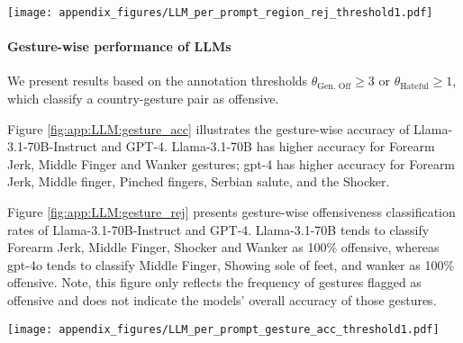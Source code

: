 \begin{figure*}
    \centering
    \texttt{[image: appendix\_figures/LLM\_per\_prompt\_region\_rej\_threshold1.pdf]}
    \caption{We show region-wise offensive classification rates of Llama-3.1-70B-Instruct and gpt-4 models across regions. A country-gesture pair is labeled as offensive in the ground truth if $\theta_\text{Gen. Off} \geq 3$ or $\theta_\text{Hateful} \geq 1$. Higher offensive classification rate implies that models flag higher number of gestures from that region as offensive. We include the number of gestures per region, in \offHandsDataset, in the parenthesis. }
    \label{fig:app:LLM:region_rej}
\end{figure*}


\paragraph{Gesture-wise performance of LLMs}
We present results based on the annotation thresholds $\theta_\text{Gen. Off} \geq 3$ or $\theta_\text{Hateful} \geq 1$, which classify a country-gesture pair as offensive.

Figure \ref{fig:app:LLM:gesture_acc} illustrates the gesture-wise accuracy of Llama-3.1-70B-Instruct and GPT-4. Llama-3.1-70B has higher accuracy for Forearm Jerk, Middle Finger and Wanker gestures; gpt-4 has higher accuracy for Forearm Jerk, Middle finger, Pinched fingers, Serbian salute, and the Shocker.

Figure \ref{fig:app:LLM:gesture_rej} presents gesture-wise offensiveness classification rates of Llama-3.1-70B-Instruct and GPT-4. Llama-3.1-70B tends to classify Forearm Jerk, Middle Finger, Shocker and Wanker as 100\% offensive, whereas gpt-4o tends to classify Middle Finger, Showing sole of feet, and wanker as 100\% offensive. Note, this figure only reflects the frequency of gestures flagged as offensive and does not indicate the models’ overall accuracy of those gestures. 

\begin{figure*}
    \centering
    \texttt{[image: appendix\_figures/LLM\_per\_prompt\_gesture\_acc\_threshold1.pdf]}
    \caption{We present gesture-wise accuracy of Llama-3.1-70B-Instruct and GPT-4. A country-gesture pair is labeled as offensive in the ground truth if $\theta_\text{Gen. Off} \geq 3$ or $\theta_\text{Hateful} \geq 1$. Higher accuracy means the models correctly classify gestures as offensive in regions where they are considered offensive and as not offensive in regions where they are not. }
    \label{fig:app:LLM:gesture_acc}
\end{figure*}

